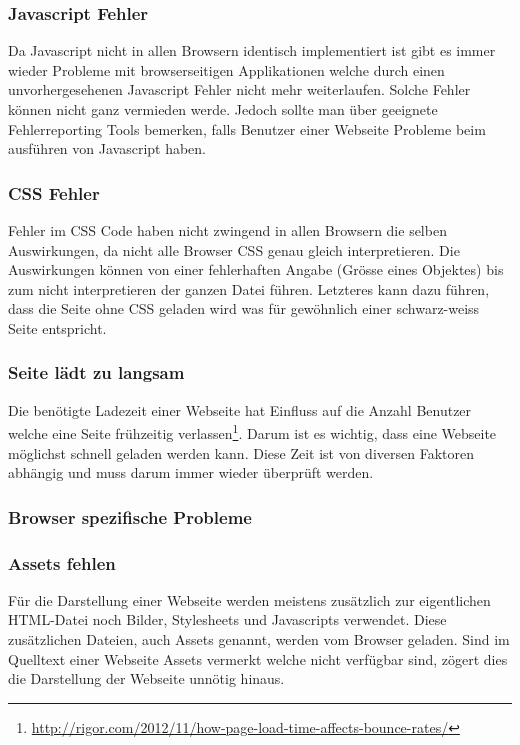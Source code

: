 \subsubsection{Javascript Fehler}
\label{ssub:javascriptfehler}
Da Javascript nicht in allen Browsern identisch implementiert ist gibt es immer wieder Probleme mit browserseitigen Applikationen welche durch einen unvorhergesehenen Javascript Fehler nicht mehr weiterlaufen. Solche Fehler können nicht ganz vermieden werde. Jedoch sollte man über geeignete Fehlerreporting Tools bemerken, falls Benutzer einer Webseite Probleme beim ausführen von Javascript haben.

\subsubsection{CSS Fehler}
\label{ssub:cssfehler}
Fehler im CSS Code haben nicht zwingend in allen Browsern die selben Auswirkungen, da nicht alle Browser CSS genau gleich interpretieren. Die Auswirkungen können von einer fehlerhaften Angabe (Grösse eines Objektes) bis zum nicht interpretieren der ganzen Datei führen. Letzteres kann dazu führen, dass die Seite ohne CSS geladen wird was für gewöhnlich einer schwarz-weiss Seite entspricht.

\subsubsection{Seite lädt zu langsam}
\label{ssub:seite_lädt_zu_langsam}
Die benötigte Ladezeit einer Webseite hat Einfluss auf die Anzahl Benutzer welche eine Seite frühzeitig verlassen\footnote{\url{http://rigor.com/2012/11/how-page-load-time-affects-bounce-rates/}}. Darum ist es wichtig, dass eine Webseite möglichst schnell geladen werden kann. Diese Zeit ist von diversen Faktoren abhängig und muss darum immer wieder überprüft werden.

\subsubsection{Browser spezifische Probleme}
\label{ssub:browserspezifischeprobleme}

\subsubsection{Assets fehlen}
\label{ssub:assetsfehlen}
Für die Darstellung einer Webseite werden meistens zusätzlich zur eigentlichen HTML-Datei noch Bilder, Stylesheets und Javascripts verwendet. Diese zusätzlichen Dateien, auch Assets genannt, werden vom Browser geladen. Sind im Quelltext einer Webseite Assets vermerkt welche nicht verfügbar sind, zögert dies die Darstellung der Webseite unnötig hinaus.

